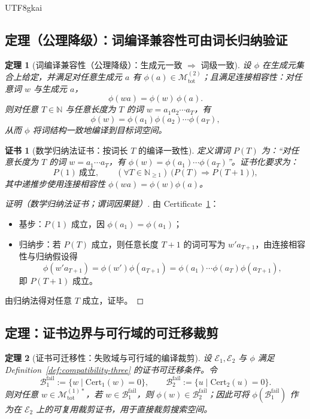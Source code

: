 \documentclass[12pt]{article}
\newtheorem{theorem}{定理}[section]
\newtheorem{certificate}{证书}[section]
\begin{document}
\begin{CJK*}{UTF8}{gkai}
\subsection{定理（公理降级）：词编译兼容性可由词长归纳验证}

\begin{theorem}[词编译兼容性（公理降级）：生成元一致 $\Rightarrow$ 词级一致]
\label{thm:word-compilation}
设 $\phi$ 在生成元集合上给定，并满足对任意生成元 $a$ 有 $\phi(a)\in \mathcal{M}_{\mathrm{tot}}^{(2)}$；且满足连接相容性：对任意词 $w$ 与生成元 $a$，
\[
\phi(wa)=\phi(w)\,\phi(a).
\]
则对任意 $T\in\mathbb{N}$ 与任意长度为 $T$ 的词 $w=a_1a_2\cdots a_T$，有
\[
\phi(w)=\phi(a_1)\phi(a_2)\cdots \phi(a_T),
\]
从而 $\phi$ 将词结构一致地编译到目标词空间。
\end{theorem}

\begin{certificate}[数学归纳法证书：按词长 $T$ 的编译一致性]
\label{cert:word-compilation-induction}
定义谓词 $P(T)$ 为：“对任意长度为 $T$ 的词 $w=a_1\cdots a_T$，有 $\phi(w)=\phi(a_1)\cdots\phi(a_T)$”。证书化要求为：
\[
P(1)\ \text{成立},\qquad
(\forall T\in\mathbb{N}_{\ge 1})\ \bigl(P(T)\Rightarrow P(T+1)\bigr),
\]
其中递推步使用连接相容性 $\phi(wa)=\phi(w)\phi(a)$。
\end{certificate}

\begin{proof}[证明（数学归纳法证书；谓词因果链）]
由 Certificate~\ref{cert:word-compilation-induction}：
\begin{itemize}
  \item 基步：$P(1)$ 成立，因 $\phi(a_1)=\phi(a_1)$；
  \item 归纳步：若 $P(T)$ 成立，则任意长度 $T{+}1$ 的词可写为 $w'a_{T+1}$，由连接相容性与归纳假设得
  \[
  \phi(w'a_{T+1})=\phi(w')\phi(a_{T+1})=\phi(a_1)\cdots\phi(a_T)\phi(a_{T+1}),
  \]
  即 $P(T{+}1)$ 成立。
\end{itemize}
由归纳法得对任意 $T$ 成立，证毕。
\end{proof}

\subsection{定理：证书边界与可行域的可迁移裁剪}

\begin{theorem}[证书可迁移性：失败域与可行域的编译裁剪]
\label{thm:cert-reuse}
设 $\mathcal{E}_1,\mathcal{E}_2$ 与 $\phi$ 满足 Definition~\ref{def:compatibility-three} 的证书可迁移条件。令
\[
\mathcal{B}_1^{\mathrm{fail}}:=\{w\mid \mathrm{Cert}_1(w)=0\},\qquad
\mathcal{B}_2^{\mathrm{fail}}:=\{u\mid \mathrm{Cert}_2(u)=0\}.
\]
则对任意 $w\in\mathcal{M}_{\mathrm{tot}}^{(1)\ast}$，若 $w\in \mathcal{B}_1^{\mathrm{fail}}$，则 $\phi(w)\in \mathcal{B}
  _2^{\mathrm{fail}}$；因此可将 $\phi(\mathcal{B}_1^{\mathrm{fail}})$ 作为在 $\mathcal{E}_2$ 上的可复用裁剪证书，用于直接裁剪搜索空间。
\end{theorem}


\end{CJK*}
\end{document}

